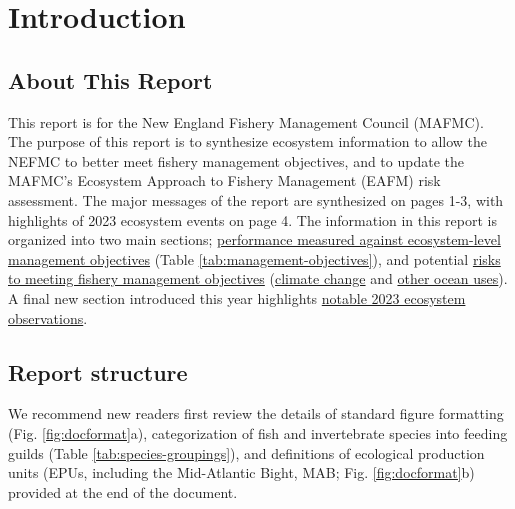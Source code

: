 \documentclass[
  10pt,
]{article}
\author{}
\date{\vspace{-2.5em}}
\begin{document}
\setcounter{page}{5}
\thispagestyle{fancy}

\hypertarget{introduction}{%
\section{Introduction}\label{introduction}}

\hypertarget{about-this-report}{%
\subsection{About This Report}\label{about-this-report}}

This report is for the New England Fishery Management Council (MAFMC). The purpose of this report is to synthesize ecosystem information to allow the NEFMC to better meet fishery management objectives, and to update the MAFMC's Ecosystem Approach to Fishery Management (EAFM) risk assessment. The major messages of the report are synthesized on pages 1-3, with highlights of 2023 ecosystem events on page 4. The information in this report is organized into two main sections; \protect\hyperlink{performance-relative-to-fishery-management-objectives}{performance measured against ecosystem-level management objectives} (Table \ref{tab:management-objectives}), and potential \protect\hyperlink{risks-to-meeting-fishery-management-objectives}{risks to meeting fishery management objectives} (\protect\hyperlink{climate-and-ecosystem-change}{climate change} and \protect\hyperlink{other-ocean-uses-offshore-wind}{other ocean uses}). A final new section introduced this year highlights \protect\hyperlink{highlights}{notable 2023 ecosystem observations}.

\hypertarget{report-structure}{%
\subsection{Report structure}\label{report-structure}}

We recommend new readers first review the details of standard figure formatting (Fig. \ref{fig:docformat}a), categorization of fish and invertebrate species into feeding guilds (Table \ref{tab:species-groupings}), and definitions of ecological production units (EPUs, including the Mid-Atlantic Bight, MAB; Fig. \ref{fig:docformat}b) provided at the end of the document.
\end{document}
